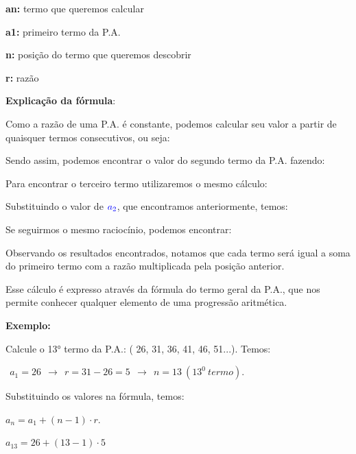 \begin{multicols*}{2}
	\textbf{an:} termo que queremos calcular

	\textbf{a1:} primeiro termo da P.A.

	\textbf{n:} posição do termo que queremos descobrir

	\textbf{r:} razão

	\textbf{Explicação da fórmula}:

	Como a razão de uma P.A. é constante, podemos calcular seu valor a partir de quaisquer termos consecutivos, ou seja:



	Sendo assim, podemos encontrar o valor do segundo termo da P.A. fazendo:


	Para encontrar o terceiro termo utilizaremos o mesmo cálculo:


	Substituindo o valor de $\color{blue}a_2$, que encontramos anteriormente, temos:


	Se seguirmos o mesmo raciocínio, podemos encontrar:



	Observando os resultados encontrados, notamos que cada termo será igual a soma do primeiro termo com a razão multiplicada pela posição anterior.

	Esse cálculo é expresso através da fórmula do termo geral da P.A., que nos permite conhecer qualquer elemento de uma progressão aritmética.

	\textbf{Exemplo:}

	Calcule o 13° termo da P.A.: ( 26, 31, 36, 41, 46, 51...). Temos:

	\color{blue}$ \ \ a_1 = 26 \ \ \to \ \ r = 31 - 26 = 5 \ \ \to \ \ n = 13 \ (13^0 \ termo)$.

	\color{black}Substituindo os valores na fórmula, temos:

	\color{blue}$ a_n = a_1 + (n - 1) \cdot r $.

	$ a_{13} = 26 + (13 - 1) \cdot 5 $


\end{multicols*}
